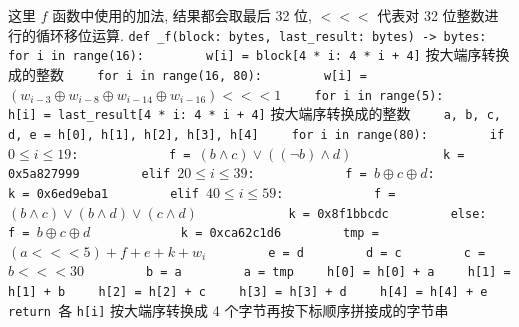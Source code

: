 \documentclass[12pt,a4paper]{article}
\begin{document}
这里 $ f $ 函数中使用的加法, 结果都会取最后 32 位, $ <<< $ 代表对 32 位整数进行的循环移位运算. 
\newline
\lstinline{def _f(block: bytes, last_result: bytes) -> bytes:}
\newline
\lstinline{    for i in range(16):}
\newline
\lstinline{        w[i] = block[4 * i: 4 * i + 4]} 按大端序转换成的整数
\newline
\lstinline{    for i in range(16, 80):}
\newline
\lstinline{        w[i] = }$(w_{i - 3} \oplus w_{i - 8} \oplus w_{i - 14} \oplus w_{i - 16}) <<< 1 $
\newline
\lstinline{    for i in range(5):}
\newline
\lstinline{        h[i] = last_result[4 * i: 4 * i + 4]} 按大端序转换成的整数
\newline
\lstinline{    a, b, c, d, e = h[0], h[1], h[2], h[3], h[4]}
\newline
\lstinline{    for i in range(80):}
\newline
\lstinline{        if }$ 0 \le i \le 19 $\lstinline{:}
\newline
\lstinline{            f = }$ (b \wedge c) \vee ((\neg b) \wedge d) $
\newline
\lstinline{            k = 0x5a827999}
\newline
\lstinline{        elif }$ 20 \le i \le 39 $\lstinline{:}
\newline
\lstinline{            f = }$ b \oplus c \oplus d $\lstinline{:}
\newline
\lstinline{            k = 0x6ed9eba1}
\newline
\lstinline{        elif }$ 40 \le i \le 59 $\lstinline{:}
\newline
\lstinline{            f = }$ (b \wedge c) \vee (b \wedge d) \vee (c \wedge d) $
\newline
\lstinline{            k = 0x8f1bbcdc}
\newline
\lstinline{        else:}
\newline
\lstinline{            f = }$ b \oplus c \oplus d $
\newline
\lstinline{            k = 0xca62c1d6}
\newline
\lstinline{        tmp = }$ (a <<< 5) + f + e + k + w_i $
\newline
\lstinline{        e = d}
\newline
\lstinline{        d = c}
\newline
\lstinline{        c = }$ b <<< 30 $
\newline
\lstinline{        b = a}
\newline
\lstinline{        a = tmp}
\newline
\lstinline{    h[0] = h[0] + a}
\newline
\lstinline{    h[1] = h[1] + b}
\newline
\lstinline{    h[2] = h[2] + c}
\newline
\lstinline{    h[3] = h[3] + d}
\newline
\lstinline{    h[4] = h[4] + e}
\newline
\lstinline{    return }各 \lstinline{h[i]} 按大端序转换成 4 个字节再按下标顺序拼接成的字节串
\end{document}
